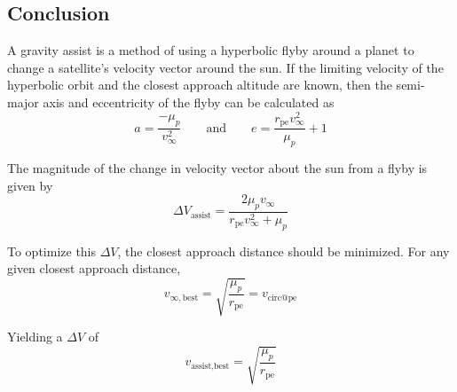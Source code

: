 \documentclass[../main.tex]{subfiles}
\begin{document}

\bigskip\bigskip
\subsection{Conclusion}

A gravity assist is a method of using a hyperbolic flyby around a planet to change a satellite's velocity vector around the sun. If the limiting velocity of the hyperbolic orbit and the closest approach altitude are known, then the semi-major axis and eccentricity of the flyby can be calculated as
$$a=\frac{-\mu_p}{v_\infty^2}\qquad\text{and}\qquad e=\frac{r_\text{pe}v_\infty^2}{\mu_p}+1$$

The magnitude of the change in velocity vector about the sun from a flyby is given by
$$\Delta V_\text{assist}=\frac{2\mu_p v_\infty}{r_\text{pe}v_\infty^2+\mu_p}$$

To optimize this $\Delta V$, the closest approach distance should be minimized. For any given closest approach distance,
$$v_{\infty,\text{best}}=\sqrt{\frac{\mu_p}{r_\text{pe}}}=v_\text{circ@pe}$$

Yielding a $\Delta V$ of
$$v_\text{assist,best} = \sqrt{\frac{\mu_p}{r_\text{pe}}}$$
\end{document}
